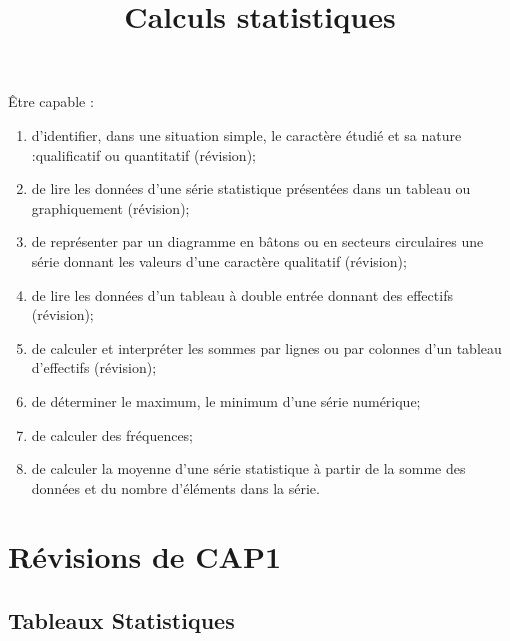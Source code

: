 \documentclass[12pt,a4paper]{article}
\date{}
\title{Calculs statistiques }
\begin{document}


\begin{myobj}
	Être capable : 
\begin{enumerate}
	\item d'identifier, dans une situation simple, le caractère étudié et sa nature :qualificatif ou quantitatif (révision);
	\item de lire les données d'une série statistique présentées dans un tableau ou graphiquement (révision);
	\item de représenter par un diagramme en bâtons ou en secteurs circulaires une série donnant les valeurs d'une caractère qualitatif (révision);
	\item de lire les données d'un tableau à double entrée donnant des effectifs (révision);
	\item de calculer et interpréter les sommes par lignes ou par colonnes d'un tableau d'effectifs (révision);
	\item de déterminer le maximum, le minimum d'une série numérique;
	\item de calculer des fréquences;
	\item de calculer la moyenne d'une série statistique à partir de la somme des données et du nombre d'éléments dans la série.
	
\end{enumerate}
\end{myobj}
\section{Révisions de CAP1}





\subsection{Tableaux Statistiques}
\end{document}
